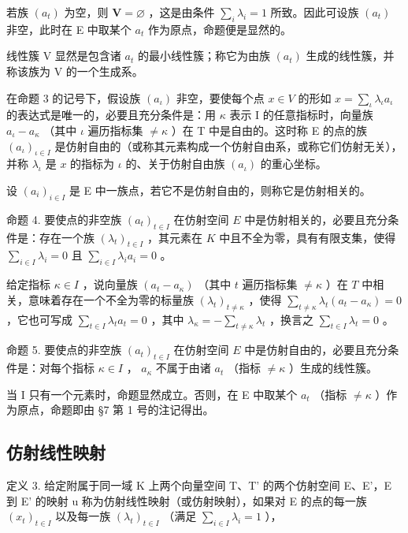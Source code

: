 若族 \((a_{t})\) 为空，则 \(\mathbf{V} = \varnothing\) ，这是由条件 \(\sum_{i}\lambda_{i} = 1\) 所致。因此可设族 \((a_{t})\) 非空，此时在 E 中取某个 \(a_{t}\) 作为原点，命题便是显然的。

线性簇 V 显然是包含诸 \(a_{t}\) 的最小线性簇；称它为由族 \((a_{t})\) 生成的线性簇，并称该族为 V 的一个生成系。

在命题 3 的记号下，假设族 \((a_{\iota})\) 非空，要使每个点 \(x \in V\) 的形如 \(x = \sum_{\iota} \lambda_{\iota} a_{\iota}\) 的表达式是唯一的，必要且充分条件是：用 \(\kappa\) 表示 I 的任意指标时，向量族 \(a_{\iota} - a_{\kappa}\) （其中 \(\iota\) 遍历指标集 \(\neq \kappa\) ）在 T 中是自由的。这时称 E 的点的族 \((a_{\iota})_{\iota \in I}\) 是仿射自由的（或称其元素构成一个仿射自由系，或称它们仿射无关），并称 \(\lambda_{\iota}\) 是 \(x\) 的指标为 \(\iota\) 的、关于仿射自由族 \((a_{\iota})\) 的重心坐标。

设 \((a_{i})_{i\in I}\) 是 E 中一族点，若它不是仿射自由的，则称它是仿射相关的。

命题 4. 要使点的非空族 \((a_{t})_{t\in I}\) 在仿射空间 \(E\) 中是仿射相关的，必要且充分条件是：存在一个族 \((\lambda_t)_{t\in I}\) ，其元素在 \(K\) 中且不全为零，具有有限支集，使得 \(\sum_{i\in I}\lambda_i = 0\) 且 \(\sum_{i\in I}\lambda_i a_i = 0\) 。

给定指标 \(\kappa \in I\) ，说向量族 \((a_{t} - a_{\kappa})\) （其中 \(t\) 遍历指标集 \(\neq \kappa\) ）在 \(T\) 中相关，意味着存在一个不全为零的标量族 \((\lambda_{t})_{t \neq \kappa}\) ，使得 \(\sum_{t \neq \kappa} \lambda_{t}(a_{t} - a_{\kappa}) = 0\) ，它也可写成 \(\sum_{t \in I} \lambda_{t} a_{t} = 0\) ，其中 \(\lambda_{\kappa} = -\sum_{t \neq \kappa} \lambda_{t}\) ，换言之 \(\sum_{t \in I} \lambda_{t} = 0\) 。

命题 5. 要使点的非空族 \((a_{t})_{t\in I}\) 在仿射空间 \(E\) 中是仿射自由的，必要且充分条件是：对每个指标 \(\kappa\in I\) ， \(a_{\kappa}\) 不属于由诸 \(a_{t}\) （指标 \(\neq\kappa\) ）生成的线性簇。

当 I 只有一个元素时，命题显然成立。否则，在 E 中取某个 \(a_{t}\) （指标 \(\neq\kappa\) ）作为原点，命题即由 §7 第 1 号的注记得出。

\subsection{仿射线性映射}

定义 3. 给定附属于同一域 K 上两个向量空间 T、T' 的两个仿射空间 E、E'，E 到 E' 的映射 u 称为仿射线性映射（或仿射映射），如果对 E 的点的每一族 \((x_{t})_{t\in I}\) 以及每一族 \((\lambda_{t})_{t\in I}\) （满足 \(\sum_{i\in I}\lambda_{i}=1\) ），

